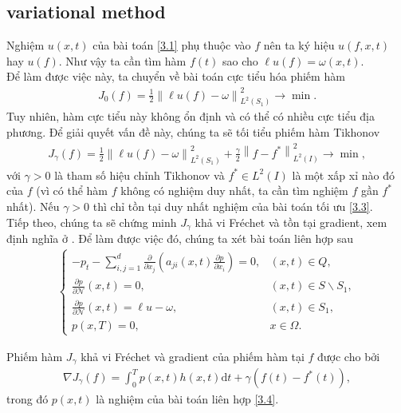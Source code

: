 \documentclass[]{article}
\begin{document}
\subsection{variational method}
\qquad Nghiệm $u(x, t)$ của bài toán \eqref{3.1} phụ thuộc vào $f$ nên ta ký hiệu $u(f, x, t)$ hay $u(f)$. Như vậy ta cần tìm hàm $f(t)$ sao cho $\ell u(f)=\omega(x, t)$.
\\
Để làm được việc này, ta chuyển về bài toán cực tiểu hóa phiếm hàm
\begin{align}\label{3.2}
	J_0(f)=\frac{1}{2}\left\|\ell u(f)-\omega\right\|_{L^2(S_1)}^2\to \min.
\end{align}
Tuy nhiên, hàm cực tiểu này không ổn định và có thể có nhiều cực tiểu địa phương. Để giải quyết vấn đề này, chúng ta sẽ tối tiểu phiếm hàm Tikhonov
\begin{align}\label{3.3}
	J_{\gamma}(f)=\frac{1}{2}\left\|\ell u(f)-\omega\right\|_{L^2(S_1)}^2+\frac{\gamma}{2}\left\|f-f^*\right\|_{L^2(I)}^2\to \min,
\end{align}
với $\gamma >0$ là tham số hiệu chỉnh Tikhonov và $f^*\in L^2(I)$ là một xấp xỉ nào đó của $f$ (vì có thể hàm $f$ không có nghiệm duy nhất, ta cần tìm nghiệm $f$ gần $f^*$ nhất). Nếu $\gamma>0$ thì chỉ tồn tại duy nhất nghiệm của bài toán tối ưu \eqref{3.3}.\\
Tiếp theo, chúng ta sẽ chứng minh $J_\gamma$ khả vi Fréchet và tồn tại gradient, xem định nghĩa ở \cite[trang 58]{b1}. Để làm được việc đó, chúng ta xét bài toán liên hợp sau
\begin{align}\label{3.4}
	\begin{cases}
		-p_t-\sum_{i, j=1}^{d}\frac{\partial}{\partial x_j}\left(a_{ji}(x, t)\frac{\partial p}{\partial x_i}\right)=0, & (x, t)\in Q,\\
		\frac{\partial p}{\partial \mathcal{N}}(x, t)=0, & (x, t)\in S\backslash S_1,\\[0.2cm]
		\frac{\partial p}{\partial \mathcal{N}}(x, t)=\ell u-\omega, & (x, t)\in S_1,\\
		p(x, T)=0, & x\in \Omega.
	\end{cases}
\end{align}
\begin{dl}\label{dl3.1}
	Phiếm hàm $J_\gamma$ khả vi Fréchet và gradient của phiếm hàm tại $f$ được cho bởi
	\begin{align}\label{3.5}
		\nabla J_\gamma(f)=\int_{0}^{T}p(x, t)h(x, t)\mathrm{d}t+\gamma (f(t)-f^*(t)),
	\end{align}
	trong đó $p(x, t)$ là nghiệm của bài toán liên hợp \eqref{3.4}.
\end{dl}
\end{document}
